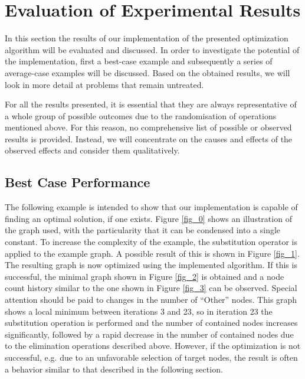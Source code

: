 \documentclass[
	accentcolor=1c,%
	type=intern,
	marginpar=false,
	ruledheaders=section,
	class=report,
	BCOR=5mm,
      parskip=half-,
	fontsize=10pt
	]{tudapub}
\begin{document}
{	\section{Evaluation of Experimental Results}
		In this section the results of our implementation of the presented optimization algorithm will be evaluated and discussed.
		In order to investigate the potential of the implementation, first a best-case example and subsequently a series of average-case examples will be discussed.
		Based on the obtained results, we will look in more detail at problems that remain untreated.

		For all the results presented, it is essential that they are always representative of a whole group of possible outcomes due to the randomisation of operations mentioned above.
		For this reason, no comprehensive list of possible or observed results is provided.
		Instead, we will concentrate on the causes and effects of the observed effects and consider them qualitatively.
		\subsection{Best Case Performance}
			The following example is intended to show that our implementation is capable of finding an optimal solution, if one exists.
			Figure \ref{fig_0} shows an illustration of the graph used, with the particularity that it can be condensed into a single constant.
			To increase the complexity of the example, the substitution operator is applied to the example graph. A possible result of this is shown in Figure \ref{fig_1}.
			The resulting graph is now optimized using the implemented algorithm.
			If this is successful, the minimal graph shown in Figure \ref{fig_2} is obtained and a node count history similar to the one shown in Figure \ref{fig_3} can be observed.
			Special attention should be paid to changes in the number of ``Other'' nodes. This graph shows a local minimum between iterations 3 and 23, so in iteration 23 the substitution operation is performed and the number of contained nodes increases significantly, followed by a rapid decrease in the number of contained nodes due to the elimination operations described above.
			However, if the optimization is not successful, e.g. due to an unfavorable selection of target nodes, the result is often a behavior similar to that described in the following section.



}
\end{document}
